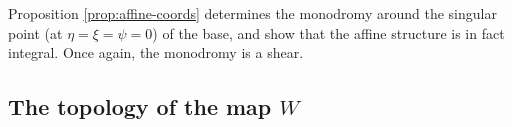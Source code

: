 \documentclass[12pt]{amsart}
\begin{document}


Proposition \ref{prop:affine-coords} determines the monodromy around
the singular point (at $\eta = \xi = \psi = 0$) of the base, and show
that the affine structure is in fact integral. Once again, the
monodromy is a shear.

\subsection{The topology of the map $W$}
\label{sec:topology-W}
\end{document}
